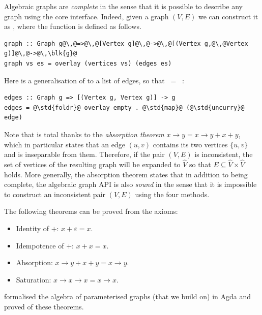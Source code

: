 Algebraic graphs are \emph{complete} in the sense that it is possible to describe
any graph using the core interface. Indeed, given a graph $(V,E)$ we can construct
it as , where the function  is defined as follows.

\begin{verbatim}
graph :: Graph g@\,@=>@\,@[Vertex g]@\,@->@\,@[(Vertex g,@\,@Vertex g)]@\,@->@\,\blk{g}@
graph vs es = overlay (vertices vs) (edges es)
\end{verbatim}

Here  is a generalisation of  to a list of edges, so that
 $\ =\ $ :

\begin{verbatim}
edges :: Graph g => [(Vertex g, Vertex g)] -> g
edges = @\std{foldr}@ overlay empty . @\std{map}@ (@\std{uncurry}@ edge)
\end{verbatim}

Note that  is total thanks to the \emph{absorption theorem}
$x \rightarrow y = x \rightarrow y + x + y$, which in particular states that
an edge $(u,v)$ contains its two vertices $\{u,v\}$ and is inseparable
from them. Therefore, if the pair $(V,E)$ is inconsistent, the set of vertices of
the resulting graph will be expanded to $\hat{V}$ so that
$E\subseteq \hat{V}\times \hat{V}$ holds. More generally, the absorption
theorem states that in addition to being complete, the algebraic graph
API is also \emph{sound} in the sense that it is impossible to construct
an inconsistent pair $(V,E)$ using the four  methods.

The following theorems can be proved from the axioms:

\begin{itemize}
    \item Identity of $+$: $x + \varepsilon = x$.
    \item Idempotence of $+$: $x + x = x$.
    \item Absorption: $x \rightarrow y + x + y = x \rightarrow y$.
    \item Saturation: $x \rightarrow x \rightarrow x = x \rightarrow x$.
\end{itemize}

\citet{2014_alekseyev_phd} formalised the algebra of parameterised graphs
(that we build on) in Agda and proved of these theorems.

